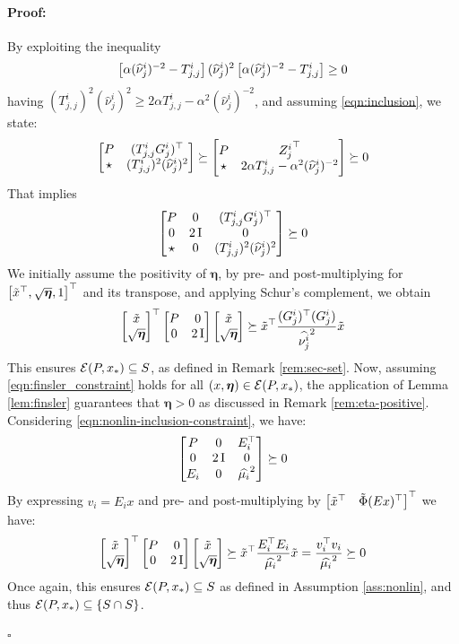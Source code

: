\documentclass{ifacconf}
\theoremstyle{plain}
\newenvironment{proof}{\paragraph*{Proof:}}{\hfill$\square$}
\begin{document}
\begin{proof}
By exploiting the inequality $$\left[\begin{matrix}\alpha (\widehat{\nu}^i_j)^{-2} - T^i_{j, j}\end{matrix}\right](\widehat{\nu}^i_j)^2\left[\begin{matrix}\alpha (\widehat{\nu}^i_j)^{-2} - T^i_{j, j}\end{matrix}\right] \geq 0$$ having $(T^i_{j,j})^2(\widehat{\nu}^i_j)^2 \geq 2 \alpha T^i_{j,j} - \alpha^2 (\widehat{\nu}_j^i)^{-2}$, and assuming \eqref{eqn:inclusion}, we state:
$$
\left[\begin{matrix}
P & (T^i_{j,j} G^i_j)^\top\\
\star & (T^i_{j,j})^2(\widehat{\nu}^i_j)^2
\end{matrix}\right] \succeq 
\left[\begin{matrix}
P & {Z_j^i}^\top\\
\star & 2 \alpha T^i_{j,j} - \alpha^2 (\widehat{\nu}_j^i)^{-2}
\end{matrix}\right] \succeq 0
$$
That implies
$$
\left[\begin{matrix}
P & 0 & (T^i_{j,j} G^i_j)^\top\\
0 & 2 \operatorname{I} & 0\\
\star & 0 &(T^i_{j,j})^2(\widehat{\nu}^i_j)^2
\end{matrix}\right] \succeq 0
$$
We initially assume the positivity of $\boldsymbol{\eta}$, by pre- and post-multiplying for $\left[\begin{matrix}\tilde{x}^\top, \sqrt{\boldsymbol{\eta}}, 1\end{matrix}\right]^\top$ and its transpose, and applying Schur's complement, we obtain
$$
\left[\begin{matrix}\tilde{x}\\ \sqrt{\boldsymbol{\eta}}\end{matrix}\right]^\top \left[\begin{matrix}P & 0\\ 0 & 2 \operatorname{I}\end{matrix}\right] \left[\begin{matrix}\tilde{x}\\ \sqrt{\boldsymbol{\eta}}\end{matrix}\right] \succeq \tilde{x}^\top \frac{(G^i_j)^\top (G^i_j)}{\widehat{\nu^i_j}^2} \tilde{x}
$$
This ensures ${\mathcal{E}}(P, x_*) \subseteq S$, as defined in Remark \ref{rem:sec-set}. Now, assuming \eqref{eqn:finsler_constraint} holds for all $(x, \boldsymbol{\eta}) \in {\mathcal{E}}(P, x_*)$, the application of Lemma \ref{lem:finsler} guarantees that $\boldsymbol{\eta} > 0$ as discussed in Remark \ref{rem:eta-positive}. Considering \eqref{eqn:nonlin-inclusion-constraint}, we have:
$$
\left[\begin{matrix}P & 0 & E_i^\top \\
0 & 2 \operatorname{I} & 0 \\
E_i & 0 & \widehat{\mu_i}^2\end{matrix}\right] \succeq 0
$$
By expressing $v_i = E_i x$ and pre- and post-multiplying by $\left[\begin{matrix}\tilde{x}^\top & \tilde{\Phi}(Ex)^\top\end{matrix}\right]^\top$ we have:
$$
\left[\begin{matrix}\tilde{x}\\ \sqrt{\boldsymbol{\eta}}\end{matrix}\right]^\top \left[\begin{matrix}P & 0\\ 0 & 2 \operatorname{I}\end{matrix}\right] \left[\begin{matrix}\tilde{x}\\ \sqrt{\boldsymbol{\eta}}\end{matrix}\right] \succeq \tilde{x}^\top \frac{E_i^\top E_i}{\widehat{\mu_i}^2} \tilde{x} = \frac{v_i^\top v_i}{\widehat{\mu_i}^2} \succeq 0
$$
Once again, this ensures ${\mathcal{E}}(P, x_*) \subseteq \relax{S}$ as defined in Assumption \ref{ass:nonlin}, and thus ${\mathcal{E}}(P, x_*) \subseteq \left\{ S \cap \relax{S} \right\}$.


\end{proof}
\end{document}
